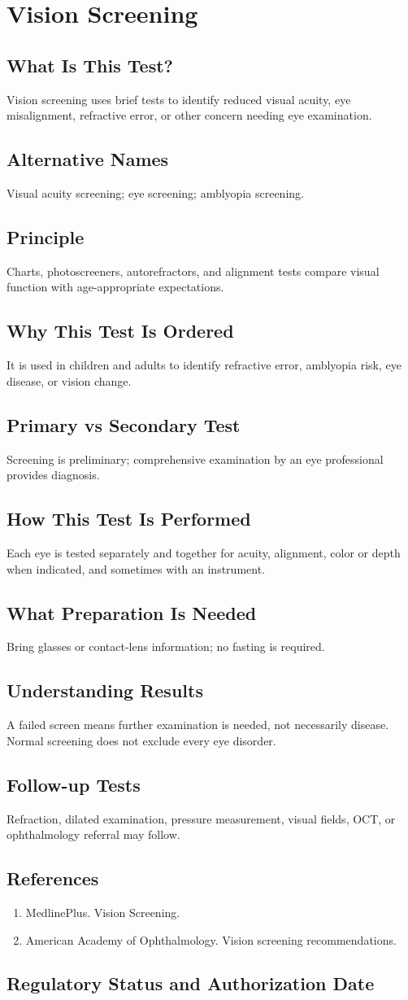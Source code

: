 \chapter{Vision Screening}
\section*{What Is This Test?} Vision screening uses brief tests to identify reduced visual acuity, eye misalignment, refractive error, or other concern needing eye examination.\section*{Alternative Names} Visual acuity screening; eye screening; amblyopia screening.\section*{Principle} Charts, photoscreeners, autorefractors, and alignment tests compare visual function with age-appropriate expectations.\section*{Why This Test Is Ordered} It is used in children and adults to identify refractive error, amblyopia risk, eye disease, or vision change.\section*{Primary vs Secondary Test} Screening is preliminary; comprehensive examination by an eye professional provides diagnosis.\section*{How This Test Is Performed} Each eye is tested separately and together for acuity, alignment, color or depth when indicated, and sometimes with an instrument.\section*{What Preparation Is Needed} Bring glasses or contact-lens information; no fasting is required.\section*{Understanding Results} A failed screen means further examination is needed, not necessarily disease. Normal screening does not exclude every eye disorder.\section*{Follow-up Tests} Refraction, dilated examination, pressure measurement, visual fields, OCT, or ophthalmology referral may follow.\section*{References} \begin{enumerate}\item MedlinePlus. Vision Screening.\item American Academy of Ophthalmology. Vision screening recommendations.\end{enumerate}\clearpage\section*{Regulatory Status and Authorization Date}\clearpage
